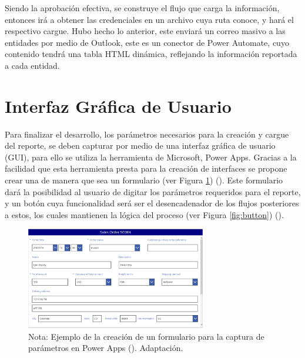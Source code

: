 \documentclass[letter,oneside,12pt,spanish]{report}
\begin{document}
\noindent Siendo la aprobación efectiva, se construye el flujo que carga la información, entonces irá a obtener las credenciales en un archivo cuya ruta conoce, y hará el respectivo cargue. Hubo hecho lo anterior, este enviará un correo masivo a las entidades por medio de Outlook, este es un conector de Power Automate, cuyo contenido tendrá una tabla HTML dinámica, reflejando la información reportada a cada entidad. 

\section{Interfaz Gráfica de Usuario}

\noindent Para finalizar el desarrollo, los parámetros necesarios para la creación y cargue del reporte, se deben capturar por medio de una interfaz gráfica de usuario (GUI), para ello se utiliza la herramienta de Microsoft, Power Apps. Gracias a la facilidad que esta herramienta presta para la creación de interfaces se propone crear una de manera que sea un formulario (ver Figura \ref{fig:createapp}) (\cite{tapanm2024powerapps}). Este formulario dará la posibilidad al usuario de digitar los parámetros requeridos para el reporte, y un botón cuya funcionalidad será ser el desencadenador de los flujos posteriores a estos, los cuales mantienen la lógica del proceso (ver Figura \ref{fig:button}) (\cite{tapanm2024powerapps}).

\begin{figure}[ht]
    \centering
    \includegraphics[width=0.7\textwidth]{Figs/creacion app ejemplo.png}
    \label{fig:createapp}
    \\Nota:  Ejemplo de la creación de un formulario para la captura de parámetros en Power Apps (\cite{tapanm2024powerapps}). Adaptación.
\end{figure}
\end{document}
